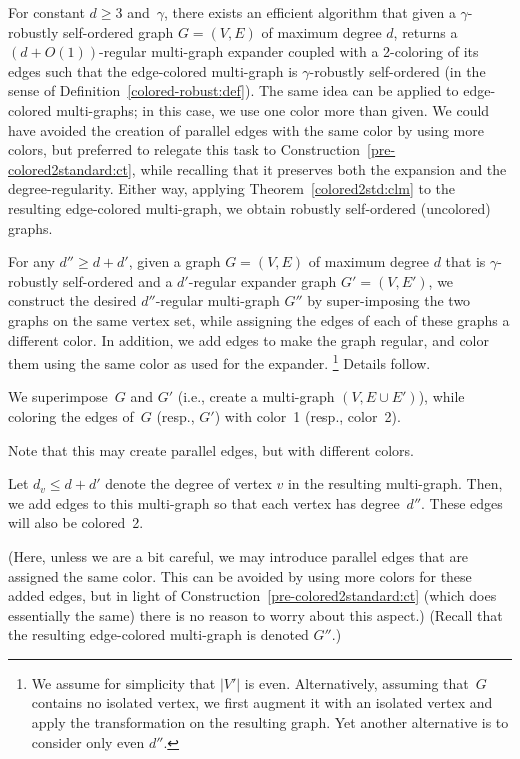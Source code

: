 \label{make:regular+expanding:thm}
For constant $d\geq3$ and~$\gamma$,
there exists an efficient algorithm
that given a $\gamma$-robustly self-ordered
graph $G=(V,E)$ of maximum degree $d$,
returns a $(d+O(1))$-regular multi-graph expander
coupled with a 2-coloring of its edges
such that the edge-colored multi-graph is $\gamma$-robustly self-ordered
{\rm(in the sense of Definition~\ref{colored-robust:def})}.
\ET
The same idea can be applied to edge-colored multi-graphs;
in this case, we use one color more than given.
We could have avoided the creation of parallel edges
with the same color by using more colors,
but preferred to relegate this task to
Construction~\ref{pre-colored2standard:ct},
while recalling that it preserves both the expansion
and the degree-regularity.
Either way, applying Theorem~\ref{colored2std:clm}
to the resulting edge-colored multi-graph,
we obtain robustly self-ordered (uncolored) graphs.
\medskip


\BPF
For any $d''\geq d+d'$,
given a graph $G=(V,E)$ of maximum degree $d$ that
is $\gamma$-robustly self-ordered and a $d'$-regular expander
graph $G'=(V,E')$,
%
we construct the desired $d''$-regular multi-graph $G''$
by super-imposing the two graphs on the same vertex set,
while assigning the edges of each of these graphs a different color.
In addition, we add edges to make the graph regular,
and color them using the same color as used for the expander.
\footnote{We assume for simplicity that $|V'|$ is even.
Alternatively, assuming that~$G$ contains no isolated vertex,
we first augment it with an isolated vertex
and apply the transformation on the resulting graph.
Yet another alternative is to consider only even $d''$.}
%
%
%
%
%
Details follow.

\BI
\item
We superimpose~$G$ and $G'$ (i.e., create a multi-graph $(V,E\cup E')$),
while coloring the edges of~$G$ (resp., $G'$)
with color~1 (resp., color~2).

Note that this may create parallel edges,
but with different colors.
\item
Let $d_v\leq d+d'$ denote the degree of vertex $v$
in the resulting multi-graph.
Then, we add edges to this multi-graph so that each vertex has degree~$d''$.
These edges will also be colored~2.

(Here, unless we are a bit careful, we may introduce
parallel edges that are assigned the same color.
This can be avoided by using more colors for these added edges,
%
%
but in light of Construction~\ref{pre-colored2standard:ct}
(which does essentially the same)
there is no reason to worry about this aspect.)
\EI
(Recall that the resulting edge-colored multi-graph is denoted $G''$.)

